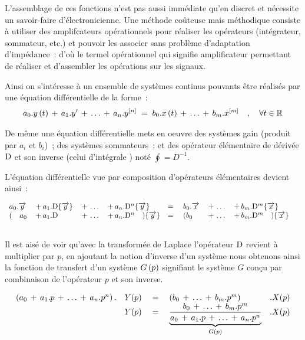 L'assemblage de ces fonctions n'est pas aussi immédiate qu'en discret
et nécessite un savoir-faire d'électronicienne. Une méthode coûteuse
mais méthodique consiste à utiliser des amplifcateurs opérationnels
pour réaliser les opérateurs (intégrateur, sommateur, etc.) et pouvoir
les associer sans problème d'adaptation d'impédance~: d'où le termel
\og{}opérationnel\fg{} qui signifie amplificateur permettant de
réaliser et d'assembler les opérations sur les signaux.

Ainsi on s'intéresse à un ensemble de systèmes continus pouvants être
réalisés par une équation différentielle de la forme~:
\begin{eqnarray}
  \label{eq:systeme_equa_diff}
   a_0.y\left(t\right) \,+\,  a_1.y' \,+\,  \dots \,+\, a_n.y^{\left[n\right]}     \;=\;  b_0.x\left(t\right) \,+\, \dots \,+\,b_m.x^{\left[m\right]}  \quad,\quad \forall t\in\mathbb{R}
\end{eqnarray}


De même une équation différentielle mets en oeuvre des systèmes gain
(produit par $a_i$ et $b_i$)~; des systèmes sommateurs~; et des
opérateur élémentaire de dérivée $\mathrm{D}$ et son inverse (celui
d'intégrale ) noté $\oint = D^{-1}$.

L'équation différentielle vue par composition d'opérateurs élémentaires devient ainsi~:

\begin{equation}
  \begin{array}{llllllll}
a_0.\overrightarrow{y}{} \,&+\, {a_1.\mathrm{D}}\!\left\{\overrightarrow{y}\right\} \,&+\, \dots \,&+\, a_n.\mathrm{D}^n\!\left\{\overrightarrow{y}\right\}   &= \quad  b_0.\overrightarrow{x}{} \,&+\, \dots \,&+\,{b_m.\mathrm{D}^m}\!\left\{\overrightarrow{x}\right\} \nonumber \\
  (\quad a_0 \,&+\, {a_1.\mathrm{D}} \,&+\,\dots \,&+\, a_n.\mathrm{D}^n \quad)\!\left\{\overrightarrow{y}\right\} &=\quad (b_0 \,&+\, \dots \,&+\,  {b_m.\mathrm{D}^m} \quad ) \!\left\{\overrightarrow{x}\right\} \nonumber \\ &&&&&&&
  \end{array}
\end{equation}

Il est aisé de voir qu'avec la transformée de Laplace l'opérateur
$\mathrm{D}$ revient à multiplier par $p$, en ajoutant la notion d'inverse
d'un système nous obtenons ainsi la fonction de transfert d'un système
$G\left(p\right)$ signifiant le système $G$ conçu par combinaison de l'opérateur $p$ et son inverse.

\begin{equation}
  \begin{array}{lll}
    \left( a_0 \,+\, {a_1.p} \,+\,\dots \,+\, a_n.p^n \right).&Y(p) \quad=\quad \left(b_0 \,+\, \dots \,+\,  {b_m.p^m} \right) &.X(p) \nonumber \\
                 & Y(p)\quad=\quad\underbrace{\frac{b_0 \,+\, \dots \,+\,  {b_m.p^m}}{a_0 \,+\, {a_1.p} \,+\,\dots \,+\, a_n.p^n}}_{G(p)} &.X(p)
  \end{array}
\end{equation}


